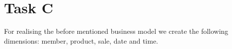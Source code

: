 \section{Task C}
For realising the before mentioned business model we create the following dimensions:
member, product, sale, date and time.

